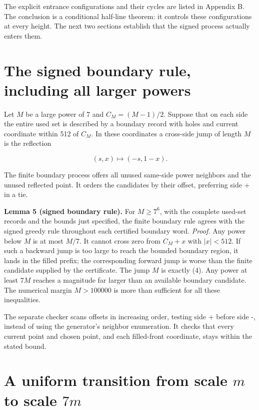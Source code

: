 \documentclass[11pt,a4paper]{article}
\begin{document}
The explicit entrance configurations and their cycles are listed in Appendix B. The conclusion is a conditional half-line theorem: it controls these configurations at every height. The next two sections establish that the signed process actually enters them.

\section{The signed boundary rule, including all larger powers}
\label{sec:5}

Let $M$ be a large power of 7 and $C_M=(M-1)/2$. Suppose that on each side the entire used set is described by a boundary record with holes and current coordinate within 512 of $C_M$. In these coordinates a cross-side jump of length $M$ is the reflection

\begin{equation*}
(s,x)\longmapsto(-s,1-x). \tag{4}\label{eq:reflection}
\end{equation*}

The finite boundary process offers all unused same-side power neighbors and the unused reflected point. It orders the candidates by their offset, preferring side + in a tie.

\noindent\textbf{Lemma 5 (signed boundary rule).} For $M\ge7^6$, with
the complete used-set records and the bounds just specified, the finite
boundary rule agrees with the signed greedy rule throughout each
certified boundary word.
\emph{Proof.} Any power below $M$ is at most $M/7$. It cannot cross zero from $C_M+x$ with $|x|<512$. If such a backward jump is too large to reach the bounded boundary region, it lands in the filled prefix; the corresponding forward jump is worse than the finite candidate supplied by the certificate. The jump $M$ is exactly (4). Any power at least $7M$ reaches a magnitude far larger than an available boundary candidate. The numerical margin $M>100000$ is more than sufficient for all these inequalities.

The separate checker scans offsets in increasing order, testing side + before side -, instead of using the generator's neighbor enumeration. It checks that every current point and chosen point, and each filled-front coordinate, stays within the stated bound.

\section{A uniform transition from scale $m$ to scale $7m$}
\label{sec:6}
\end{document}
